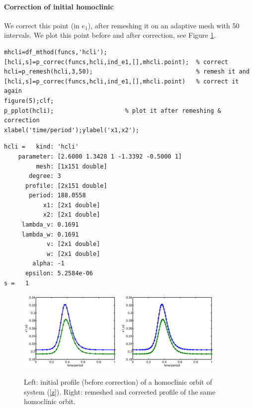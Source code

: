 \documentclass[10pt]{scrartcl}
\begin{document}
{\paragraph{Correction of initial homoclinic}
We correct this point (in $e_1$), after remeshing it on an adaptive
mesh with 50 intervals.  We plot this point before and after
correction, see Figure \ref{demo3-4+5}.
\begin{lstlisting}
mhcli=df_mthod(funcs,'hcli');
[hcli,s]=p_correc(funcs,hcli,ind_e1,[],mhcli.point);  % correct
hcli=p_remesh(hcli,3,50);                             % remesh it and
[hcli,s]=p_correc(funcs,hcli,ind_e1,[],mhcli.point)   % correct it again
figure(5);clf;
p_pplot(hcli);                    % plot it after remeshing & correction
xlabel('time/period');ylabel('x1,x2');  
\end{lstlisting}
{\small
\begin{verbatim}
hcli =   kind: 'hcli'
    parameter: [2.6000 1.3428 1 -1.3392 -0.5000 1]
         mesh: [1x151 double]
       degree: 3
      profile: [2x151 double]
       period: 188.0558
           x1: [2x1 double]
           x2: [2x1 double]
     lambda_v: 0.1691
     lambda_w: 0.1691
            v: [2x1 double]
            w: [2x1 double]
        alpha: -1
      epsilon: 5.2584e-06
s =   1
\end{verbatim}
}
\begin{figure}[ht]
\begin{center}
\includegraphics[width=0.45\textwidth]{fig/hom_demfig04}
\includegraphics[width=0.45\textwidth]{fig/hom_demfig05}
\caption{ Left: initial profile (before correction) of a homoclinic orbit of 
system (\ref{z}). Right: remeshed and corrected profile of the same homoclinic 
orbit. \label{demo3-4+5}} 
\end{center}
\end{figure}
}
\end{document}
